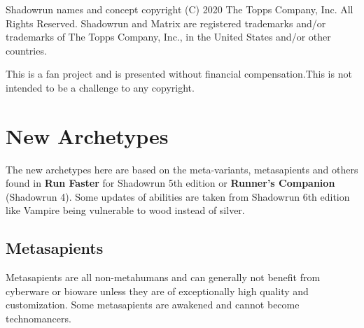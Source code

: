 \documentclass{book}
\begin{document}
\small Shadowrun names and concept copyright (C) 2020 The Topps Company, Inc. All Rights Reserved. Shadowrun and Matrix are registered trademarks and/or trademarks of The Topps Company, Inc., in the United States and/or other countries.

\small This is a fan project and is presented without financial compensation.This is not intended to be a challenge to any
copyright.
\newpage
\begin{multicols}{2}
\tableofcontents
\end{multicols}

\chapter{New Archetypes}
The new archetypes here are based on the meta-variants, metasapients and others found in \textbf{Run Faster} for Shadowrun 5th edition or \textbf{Runner's Companion} (Shadowrun 4). Some updates of abilities are taken from Shadowrun 6th edition like Vampire being vulnerable to wood instead of silver.

\section{Metasapients}
\label{sec:metasapients}
Metasapients are all non-metahumans and can generally not benefit from cyberware or bioware unless they are of exceptionally high quality and customization. Some metasapients are awakened and cannot become technomancers.
\end{document}
